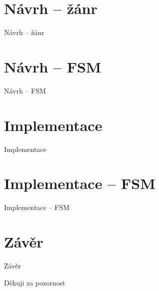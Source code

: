 \documentclass[10pt]{beamer}
\begin{document}
	\section{Návrh – žánr}
	\begin{frame}{Návrh – žánr}
	\end{frame}
	
	\section{Návrh – FSM}
	\begin{frame}{Návrh – FSM}
	\end{frame}
	
	\section{Implementace}
	\begin{frame}{Implementace}
	\end{frame}
	
	\section{Implementace – FSM}
	\begin{frame}{Implementace – FSM}
	\end{frame}

	\section{Závěr}
	\begin{frame}{Závěr}
	\end{frame}

	{
	\begin{frame}[noframenumbering] %
		Děkuji za pozornost
	\end{frame}
	}
	
\end{document}
